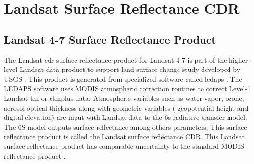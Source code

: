 
\section{Landsat Surface Reflectance CDR}
\label{sec:CDR} 
\subsection{Landsat 4-7 Surface Reflectance Product}
The Landsat \gls{cdr} surface reflectance product for Landsat 4-7 is part of the higher-level Landsat data product to support land surface change study developed by USGS \cite{LandsatCDR}. This product is generated from specialized software called \gls{ledaps} \cite{Masek:2006}. The LEDAPS software uses MODIS atmospheric correction routines to correct Level-1 Landsat \gls{tm} or \gls{etmplus} data. Atmospheric variables such as water vapor, ozone, aerosol optical thickness along with geometric variables ({ geopotential height} and digital elevation) are input with Landsat data to the \gls{6s} radiative transfer model. The 6S model outputs surface reflectance among others parameters. This surface reflectance product is called the Landsat surface reflectance CDR. This Landsat surface reflectance product has comparable uncertainty to the standard MODIS reflectance product \cite{Masek:2006}.

